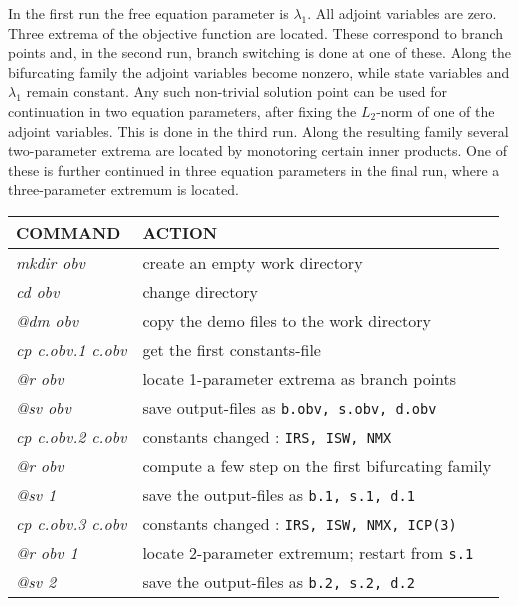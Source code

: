 \documentclass[12pt]{report}
\begin{document}
In the first run the free equation parameter is $\lambda_1$.
All adjoint variables are zero.
Three extrema of the objective function are located.
These correspond to branch points and, in the second run,
branch switching is done at one of these.
Along the bifurcating family the adjoint variables become nonzero,
while state variables and $\lambda_1$ remain constant.
Any such non-trivial solution point can be used for continuation 
in two equation parameters, after fixing the $L_2$-norm of one of 
the adjoint variables. This is done in the third run.
Along the resulting family several two-parameter extrema are located 
by monotoring certain inner products.
One of these is further continued in three equation parameters in the final run,
where a three-parameter extremum is located.


\begin{table}[htbp]
\begin{center}
\begin{tabular}{| l | l |}
\hline
  COMMAND  & ACTION \\
\hline
  {\it mkdir obv} & create an empty work directory \\ 
  {\it cd obv} & change directory \\
  {\it @dm obv} & copy the demo files to the work directory \\
\hline
  {\it cp c.obv.1 c.obv} & get the first constants-file \\ 
  {\it @r obv} & locate 1-parameter extrema as branch points \\ 
  {\it @sv obv} & save output-files as {\tt b.obv, s.obv, d.obv} \\ 
\hline
  {\it cp c.obv.2 c.obv} & constants changed : {\tt IRS, ISW, NMX} \\ 
  {\it @r obv} & compute a few step on the first bifurcating family \\ 
  {\it @sv 1} & save the output-files as {\tt b.1, s.1, d.1} \\ 
\hline
  {\it cp c.obv.3 c.obv} & constants changed : {\tt IRS, ISW, NMX, ICP(3)} \\ 
  {\it @r obv  1} & locate 2-parameter extremum; restart from {\tt s.1} \\ 
  {\it @sv 2} & save the output-files as {\tt b.2, s.2, d.2} \\ 

\end{tabular}
\end{center}
\end{table}
\end{document}
